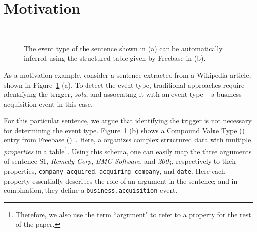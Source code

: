 \section{Motivation}
\begin{figure}
  \centering
   \\
  \caption{The event type of the sentence shown in (a) can be automatically inferred using the structured table given by Freebase in (b).}
  \label{fig:example}
\end{figure}


As a motivation example, consider a sentence extracted from a Wikipedia article, shown in Figure~\ref{fig:example} (a). To detect the event
type, traditional approaches require identifying the trigger, \emph{sold}, and associating it with an event type -- a business acquisition
event in this case.


For this particular sentence, we argue that identifying the trigger is not necessary for determining the event type.
Figure~\ref{fig:example} (b) shows a Compound Value Type (\CVT) entry from Freebase (\FB)~\cite{bollacker2008freebase}. Here, a \CVT
organizes complex structured data with multiple \emph{properties} in a table\footnote{Therefore, we also use the term ``argument" to refer
to a \CVT property for the rest of the paper.}. Using this \CVT schema, one can easily map the three arguments of sentence S1, \emph{Remedy
Corp}, \emph{BMC Software}, and \emph{2004}, respectively to their properties, \texttt{company\_acquired}, \texttt{acquiring\_company}, and
\texttt{date}. Here each property essentially describes the role of an argument in the sentence; and in combination, they define a
\texttt{business.acquisition} event.

